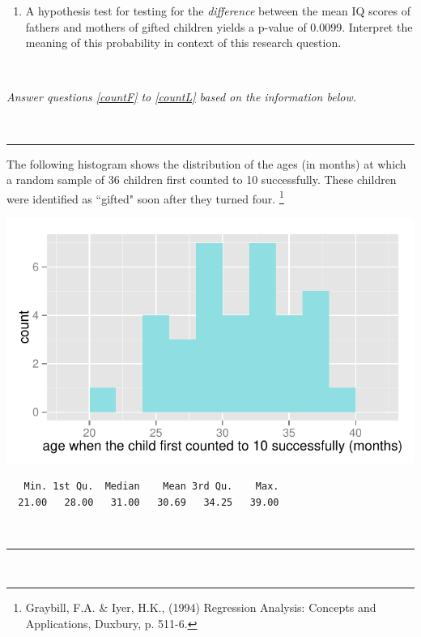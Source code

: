 \documentclass[11pt]{article}
\newcommand{\soln}[2]{$\:$\\ \vspace{#1}}{}
\begin{document}
\begin{enumerate}
\begin{enumerate}
\item A hypothesis test for testing for the \emph{difference} between the mean IQ scores of fathers and mothers 
of gifted children yields a p-value of 0.0099. Interpret the meaning of this probability in context of this research question.

\soln{3cm}{Point estimate: $\bar{x}_F - \bar{x}_M = 114.8 - 118.2 = -3.4$\\
If in fact fathers and mothers of gifted children have on average the same IQ score, the probability of getting a sample 
of 36 gifted children where the difference between the average IQ scores of fathers and mothers is 3.4 points or more is 0.0098.}

\end{enumerate}

\vfill


\pagebreak

\begin{center}
\textit{Answer questions \ref{countF} to \ref{countL} based on the information below.}
\end{center}
$\:$
\hrule
The following histogram shows the distribution of the ages (in months) at which a random sample of 36 children first 
counted to 10 successfully. These children were identified as ``gifted" soon after they turned four.
\footnote{Graybill, F.A. \& Iyer, H.K., (1994) Regression Analysis: Concepts and Applications, Duxbury, p. 511-6.}

\begin{minipage}[c]{0.5\textwidth}
\begin{center}
\includegraphics[width=\textwidth]{figures/gifted/count_hist.pdf}
\end{center}
\end{minipage}
\begin{minipage}[c]{0.5\textwidth}
\begin{center}
{\footnotesize
\begin{verbatim}
   Min. 1st Qu.  Median    Mean 3rd Qu.    Max. 
  21.00   28.00   31.00   30.69   34.25   39.00 
\end{verbatim}
}\end{center}
\end{minipage}
$\:$ \\
\hrule
$\:$


\end{enumerate}
\end{document}
